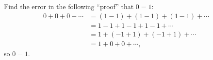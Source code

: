 Find the error in the following ``proof'' that $0=1$:
\begin{align*}
0+0+0+\cdots&=(1-1)+(1-1)+(1-1)+\cdots\\
&=1-1+1-1+1-1+\cdots\\
&=1+(-1+1)+(-1+1)+\cdots\\
&=1+0+0+\cdots,
\end{align*}
so $0=1$.
